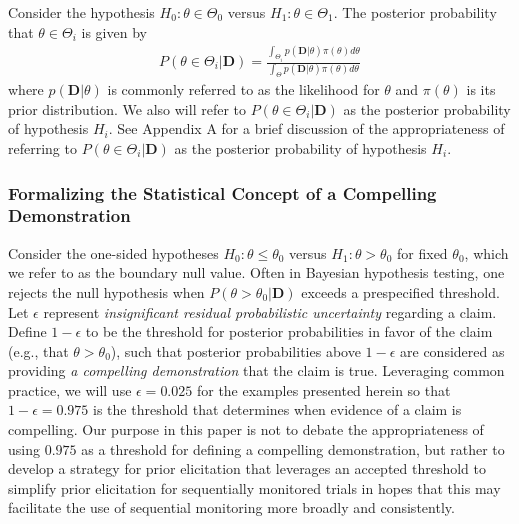 \documentclass[12pt]{article}
\begin{document}
Consider the hypothesis $H_0:\theta\in\Theta_{0}$ versus $H_1:\theta\in\Theta_{1}$. The posterior probability that $\theta\in\Theta_i$ is given by
\begin{align}\label{eq:postprob}
P(\theta\in\Theta_i|\mathbf{D})
=\frac{\int_{\Theta_i} p(\mathbf{D}|\theta)\pi (\theta)d\theta}{\int_{\Theta}p(\mathbf{D}|\theta)\pi(\theta) d\theta}
\end{align}
where $p(\mathbf{D}|\theta)$ is commonly referred to as the likelihood for $\theta$ and $\pi(\theta)$ is its prior distribution. 
%
%
%
We also will refer to $P(\theta\in\Theta_i|\mathbf{D})$ as the posterior probability of hypothesis $H_i$.
%
See Appendix A for a brief discussion of the appropriateness of referring to $P(\theta\in\Theta_i|\mathbf{D})$
as the posterior probability of hypothesis $H_i$.


\subsubsection{Formalizing the Statistical Concept of a Compelling Demonstration}\label{sec:sub_evid}
Consider the one-sided hypotheses $H_0: \theta \le \theta_0$ versus $H_1: \theta > \theta_0$ for fixed $\theta_0$, which we refer to as the boundary null value.
Often in Bayesian hypothesis testing, one rejects the null hypothesis when $P(\theta > \theta_0 |\mathbf{D})$ exceeds 
a prespecified threshold.
%
Let $\epsilon$ represent \textit{insignificant residual probabilistic uncertainty} regarding a claim. 
 Define $1-\epsilon$ to be the threshold for posterior probabilities in favor of the claim 
(e.g., that $\theta > \theta_0$), such that posterior probabilities above $1-\epsilon$ are considered as providing \textit{a compelling demonstration} 
that the claim is true. 
%
Leveraging common practice, we will use $\epsilon=0.025$ for the examples presented herein 
so that $1-\epsilon=0.975$ is the threshold that determines when evidence of a claim is compelling.
%
Our purpose in this paper is not to debate the appropriateness of using $0.975$ as a threshold for defining a compelling demonstration, but rather to develop a strategy for prior elicitation that leverages an accepted threshold to simplify prior elicitation for sequentially monitored trials in hopes that this may facilitate the use of sequential monitoring more broadly and consistently.
\end{document}
